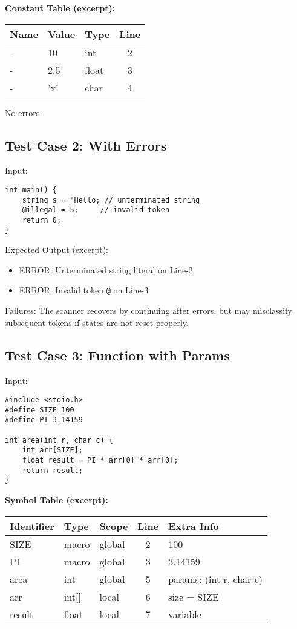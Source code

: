 \documentclass{article}
\begin{document}
\bigskip
\textbf{Constant Table (excerpt):}
\begin{center}
\begin{tabular}{|l|l|l|c|}
\hline
Name & Value & Type  & Line \\
\hline
- & 10  & int   & 2 \\
- & 2.5 & float & 3 \\
- & 'x' & char  & 4 \\
\hline
\end{tabular}
\end{center}

No errors.

\subsection{Test Case 2: With Errors}
Input:
\begin{verbatim}
int main() {
    string s = "Hello; // unterminated string
    @illegal = 5;     // invalid token
    return 0;
}
\end{verbatim}

Expected Output (excerpt):  
\begin{itemize}
\item ERROR: Unterminated string literal on Line-2
\item ERROR: Invalid token \texttt{@}  on Line-3
\end{itemize}

Failures: The scanner recovers by continuing after errors, but may misclassify subsequent tokens if states are not reset properly.

\subsection{Test Case 3: Function with Params}
Input:
\begin{verbatim}
#include <stdio.h>
#define SIZE 100
#define PI 3.14159

int area(int r, char c) {
    int arr[SIZE];
    float result = PI * arr[0] * arr[0];
    return result;
}
\end{verbatim}

\textbf{Symbol Table (excerpt):}
\begin{center}
\begin{tabular}{|l|l|l|c|l|}
\hline
Identifier & Type   & Scope  & Line & Extra Info \\
\hline
SIZE   & macro  & global & 2 & 100 \\
PI     & macro  & global & 3 & 3.14159 \\
area   & int    & global & 5 & params: (int r, char c) \\
arr    & int[]  & local  & 6 & size = SIZE \\
result & float  & local  & 7 & variable \\
\hline
\end{tabular}
\end{center}
\end{document}

